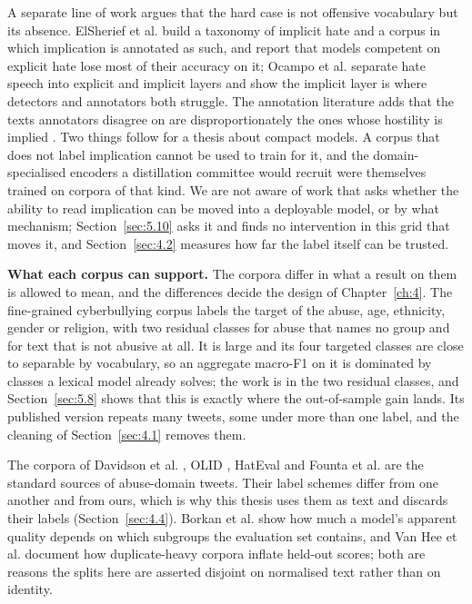 A separate line of work argues that the hard case is not offensive vocabulary but its absence.
ElSherief et al. \cite{elsherief2021latent} build a taxonomy of implicit hate and a corpus in which
implication is annotated as such, and report that models competent on explicit hate lose most of
their accuracy on it; Ocampo et al. \cite{ocampo2023indepth} separate hate speech into explicit and
implicit layers and show the implicit layer is where detectors and annotators both struggle. The
annotation literature adds that the texts annotators disagree on are disproportionately the ones
whose hostility is implied \cite{uma2021learning, davani2022dealing, plank2022problem,
peterson2019human}. Two things follow for a thesis about compact models. A corpus that does not
label implication cannot be used to train for it, and the domain-specialised encoders a distillation
committee would recruit were themselves trained on corpora of that kind. We are not aware of work
that asks whether the ability to read implication can be moved into a deployable model, or by what
mechanism; Section~\ref{sec:5.10} asks it and finds no intervention in this grid that moves it, and
Section~\ref{sec:4.2} measures how far the label itself can be trusted.

\textbf{What each corpus can support.} The corpora differ in what a result on them is allowed to mean, and the differences decide the design of
Chapter~\ref{ch:4}. The fine-grained cyberbullying corpus \cite{wang2020sosnet} labels the target of the
abuse, age, ethnicity, gender or religion, with two residual classes for abuse that names no group and
for text that is not abusive at all. It is large and its four targeted classes are close to separable by
vocabulary, so an aggregate macro-F1 on it is dominated by classes a lexical model already solves; the
work is in the two residual classes, and Section~\ref{sec:5.8} shows that this is exactly where the
out-of-sample gain lands. Its published version repeats many tweets, some under more than one label, and
the cleaning of Section~\ref{sec:4.1} removes them.

The corpora of Davidson et al. \cite{davidson2017automated}, OLID \cite{zampieri2019olid}, HatEval
\cite{basile2019hateval} and Founta et al. \cite{founta2018large} are the standard sources of
abuse-domain tweets. Their label schemes differ from one another and from ours, which is why this thesis
uses them as text and discards their labels (Section~\ref{sec:4.4}). Borkan et al.
\cite{borkan2019nuanced} show how much a model's apparent quality depends on which subgroups the
evaluation set contains, and Van Hee et al. \cite{vanhee2018automatic} document how duplicate-heavy
corpora inflate held-out scores; both are reasons the splits here are asserted disjoint on normalised
text rather than on identity.

